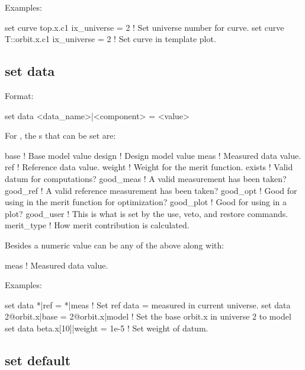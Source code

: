 {{Examples:
\begin{example}
  set curve top.x.c1 ix_universe = 2       ! Set universe number for curve.
  set curve T::orbit.x.c1 ix_universe = 2  ! Set curve in template plot.
\end{example}


\subsection{set data}
\label{s:set.data}

Format:
\begin{example}
  set data <data_name>|<component> = <value>
\end{example}

For , the s that can be set are:
\begin{example}
  base        ! Base model value
  design      ! Design model value
  meas        ! Measured data value.
  ref         ! Reference data value.
  weight      ! Weight for the merit function.
  exists      ! Valid datum for computations?
  good_meas   ! A valid measurement has been taken?
  good_ref    ! A valid reference measurement has been taken?
  good_opt    ! Good for using in the merit function for optimization?
  good_plot   ! Good for using in a plot?
  good_user   ! This is what is set by the use, veto, and restore commands.
  merit_type  ! How merit contribution is calculated.
\end{example}
Besides a numeric value  can be any of the above along with:
\begin{example}
  meas        ! Measured data value.
\end{example}

Examples:
\begin{example}
  set data *|ref = *|meas            ! Set ref data = measured in current universe.
  set data 2@orbit.x|base = 2@orbit.x|model 
                                     ! Set the base orbit.x in universe 2 to model
  set data beta.x[10]|weight = 1e-5  ! Set weight of datum.
\end{example}


\subsection{set default}
\label{s:set.default}

}}

